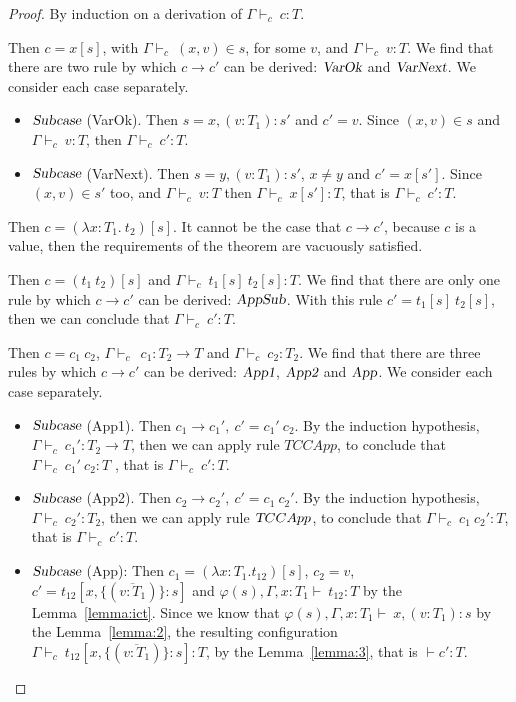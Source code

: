\documentclass[preprint,authoryear,sort&compress,9pt,nocopyrightspace]{article}
\newcommand{\tto}{\longrightarrow}
\newcommand{\conf}[2][s]{(#2)[#1]}
\newcommand{\confx}[1]{#1 [x,\{(\overline{v:T_1})\}:s]}
\newcommand{\SubxD}{x,(v:T_1):s}
\newcommand{\Subx}{x,(v:T_1):s'}
\newcommand{\Suby}{y,(v:T_1):s'}
\newcommand{\tyC}{{\Gamma \vdash_c \ }}
\newcommand{\envEC}{{\emt(s), \Gamma , x:T_1 \vdash \ }}
\newcommand{\absD}{\lambda x:T_1. \ t_2}
\newcommand{\emt}{\varphi}
\begin{document}
\begin{proof} By induction on a derivation of $\tyC c : T$.


\begin{case}[TCVar]
Then $c = x[s]$, with $\tyC (x,v) \in s$, for some $v$, and $\tyC v:T$. We find that there are two rule by which $c \tto c'$ can be derived: $\textsl {VarOk}$ and $\textsl {VarNext}$. We consider each case separately.
\begin{itemize}
\item $\textsl{Subcase}$ (VarOk). Then $s = \Subx$ and $c' = v$. Since $(x,v) \in s$ and $\tyC v:T$, then $\tyC c' : T$.

\item $\textsl{Subcase}$ (VarNext). Then $s = \Suby$, $x \neq y$ and $c' = x[s']$. Since $(x,v) \in s'$ too, and $\tyC v:T$ then $\tyC x[s']:T $, that is $\tyC c' : T$. 
\end{itemize}
\end{case}

\begin{case} [TAbs]
Then $c = \conf{\absD}$. It cannot be the case that $c \tto c'$, because $c$ is a value, then the requirements of the theorem are vacuously satisfied. 
\end{case}

\begin{case}[TCApp]
Then $c = \conf{t_1 \ t_2}$ and $\tyC t_1[s] \ t_2[s]: T$. We find that there are only one rule by which $c \tto c'$ can be derived: $\textsl {AppSub}$. With this rule $c' = t_1[s] \ t_2[s]$, then we can conclude that $\tyC c' : T$. 
\end{case}

\begin{case} [TCCApp]
Then $c = c_1 \ c_2$, $\tyC \ c_1 : T_2 \to T$ and $\tyC c_2 : T_2$. We find that there are three rules by which $c \tto c'$ can be derived: $\textsl {App1}$, $\textsl {App2}$ and $\textsl {App}$. We consider each case separately.
\begin{itemize}

\item $\textsl{Subcase}$ (App1). Then $c_1 \tto c_1', \ c' = c_1' \ c_2$. By the induction hypothesis, $\tyC c_1' : T_2 \to T$, then we can apply rule $TCCApp$, to conclude that $\tyC c_1' \ c_2: T$ , that is $\tyC c' : T$.

\item $\textsl{Subcase}$ (App2). Then $c_2 \tto c_2', \ c' = c_1 \ c_2'$. By the induction hypothesis, $\tyC c_2' : T_2 $, then we can apply rule $\textsl TCCApp$, to conclude that $\tyC c_1 \ c_2' : T$, that is $\tyC c' : T$.

\item $\textsl{Subcase}$ (App): Then $c_1 = \conf{\lambda x:T_{1}.t_{12}}$, $c_2 = v$, $c' = \confx{t_{12}}$ and $\envEC t_{12}: T$ by the Lemma~\ref{lemma:ict}. Since we know that $\envEC \SubxD$ by the Lemma~\ref{lemma:2}, the resulting configuration $\tyC \confx{t_{12}}:T$, by the Lemma~\ref{lemma:3}, that is $\vdash c' : T$.
\end{itemize}
\end{case}
\end{proof}
\end{document}
